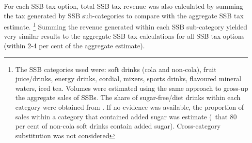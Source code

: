 \documentclass[embargoed]{grattan}
\begin{document}
For each SSB tax option, total SSB tax revenue was also calculated by summing the tax generated by SSB sub-categories to compare with the aggregate SSB tax estimate.%
\footnote{The SSB categories used were: soft drinks (cola and non-cola), fruit juice/drinks, energy drinks, cordial, mixers, sports drinks, flavoured mineral waters, iced tea.
Volumes were estimated using the same approach to gross-up the aggregate sales of SSBs.
The share of sugar-free/diet drinks within each category were obtained from \textcite[][Table~1]{Levy2014QuenchingAustraliasthirst}.
If no evidence was available, the proportion of sales within a category that contained added sugar was estimate (\eg~that 80 per cent of non-cola soft drinks contain added sugar).
Cross-category substitution was not considered} Summing the revenue generated within each SSB sub-category yielded very similar results to the aggregate SSB tax calculations for all SSB tax options (within 2-4 per cent of the aggregate estimate).

\printbibliography
\end{document}
